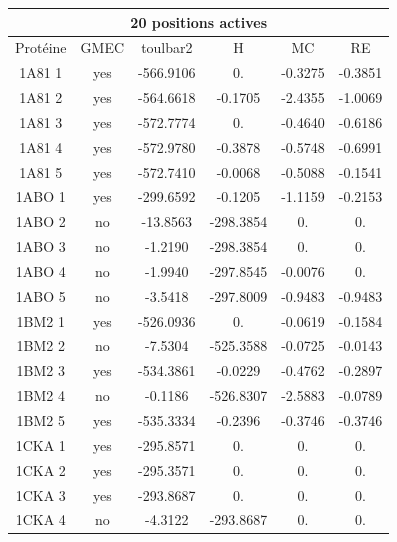     \begin{table}[h]
      \centering

      \begin{tabular}{|c|c|c|c|c|c|}


        \hline
        \multicolumn{6}{|c|}{20 positions actives} \\
        \hline
        Protéine & GMEC & toulbar2 & H & MC & RE \\
        \hline
        1A81 1 & yes  &  -566.9106 & 0. & -0.3275 & -0.3851 \\         
        1A81 2 & yes  &  -564.6618 & -0.1705 & -2.4355 & -1.0069 \\   
        1A81 3 & yes  &  -572.7774 & 0. & -0.4640 & -0.6186 \\         
        1A81 4 & yes  &  -572.9780 & -0.3878 & -0.5748 & -0.6991 \\    
        1A81 5 & yes  &  -572.7410 & -0.0068 & -0.5088 & -0.1541 \\    
        1ABO 1 & yes  &  -299.6592 & -0.1205 & -1.1159 & -0.2153 \\   
        1ABO 2 & no   &  -13.8563  & -298.3854 & 0. & 0. \\               
        1ABO 3 & no   &  -1.2190   & -298.3854 & 0. & 0. \\                 
        1ABO 4 & no   &  -1.9940   & -297.8545 & -0.0076 & 0. \\            
        1ABO 5 & no   &  -3.5418   & -297.8009 & -0.9483 & -0.9483 \\       
        1BM2 1 & yes  &  -526.0936 & 0. & -0.0619 & -0.1584 \\         
        1BM2 2 & no   &  -7.5304   & -525.3588 & -0.0725 & -0.0143 \\     
        1BM2 3 & yes  &  -534.3861 & -0.0229 & -0.4762 & -0.2897 \\    
        1BM2 4 & no   &  -0.1186   & -526.8307 & -2.5883 & -0.0789 \\     
        1BM2 5 & yes  &  -535.3334 & -0.2396 & -0.3746 & -0.3746 \\    
        1CKA 1 & yes  & -295.8571  & 0.& 0. & 0. \\                   
        1CKA 2 & yes  & -295.3571  & 0. & 0. & 0. \\                   
        1CKA 3 & yes  & -293.8687  & 0. & 0. & 0.\\                   
        1CKA 4 & no   &  -4.3122   & -293.8687 & 0. & 0. \\               

\end{tabular}
\end{table}

